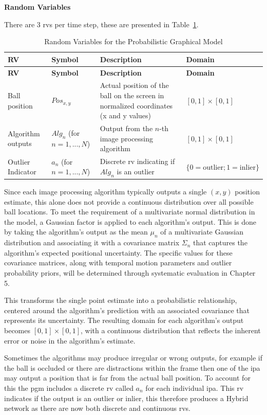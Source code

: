 \documentclass[12pt,a4paper]{article}
\begin{document}
\textbf{Random Variables}

There are 3 \acs{rv}s per time step, these are presented in Table~\ref{tab:rvs}. 

\begin{longtable}{p{} p{} p{} p{}}
\caption{Random Variables for the Probabilistic Graphical Model} \label{tab:rvs} \\
\hline
\textbf{RV} & \textbf{Symbol} & \textbf{Description} & \textbf{Domain} \\
\hline
\endfirsthead
\hline
\textbf{RV} & \textbf{Symbol} & \textbf{Description} & \textbf{Domain} \\
\hline
\endhead
\hline
\endfoot
\hline
\endlastfoot
		Ball position & $Pos_{x,y}$ & Actual position of the ball on the screen in normalized coordinates (x and y values) & $[0, 1] \times [0, 1]$ \\
		Algorithm outputs & $Alg_n$ (for $n=1,...,N$) & Output from the $n$-th image processing algorithm & $[0, 1] \times [0, 1]$ \\
		Outlier Indicator & $a_n$ (for $n=1,...,N$) & Discrete \acs{rv} indicating if $Alg_n$ is an outlier & $\{0 = \text{outlier}; 1 = \text{inlier}\}$ \\
\end{longtable}

Since each image processing algorithm typically outputs a single $(x, y)$ position estimate, this alone does not provide a continuous distribution over all possible ball locations. To meet the requirement of a multivariate normal distribution in the model, a Gaussian factor is applied to each algorithm’s output. This is done by taking the algorithm's output as the mean $\mu_n$ of a multivariate Gaussian distribution and associating it with a covariance matrix $\Sigma_n$ that captures the algorithm's expected positional uncertainty. The specific values for these covariance matrices, along with temporal motion parameters and outlier probability priors, will be determined through systematic evaluation in Chapter 5.

This transforms the single point estimate into a probabilistic relationship, centered around the algorithm's prediction with an associated covariance that represents its uncertainty. The resulting domain for each algorithm’s output becomes $[0,1]\times[0,1]$, with a continuous distribution that reflects the inherent error or noise in the algorithm's estimate.

Sometimes the algorithms may produce irregular or wrong outputs, for example if the ball is occluded or there are distractions within the frame then one of the \acs{ipa} may output a position that is far from the actual ball position. To account for this the \acs{pgm} includes a discrete \acs{rv} called $a_n$ for each individual \acs{ipa}. This \acs{rv} indicates if the output is an outlier or inlier, this therefore produces a Hybrid network as there are now both discrete and continuous \acs{rv}s.
\end{document}
